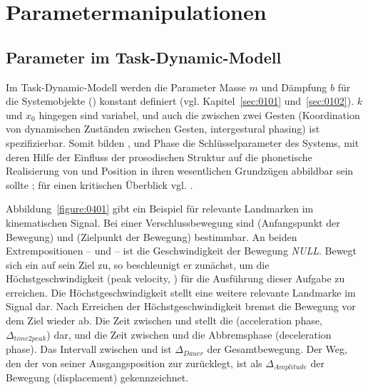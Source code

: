 \chapter{Parametermanipulationen}
\label{chap:04}

\section{Parameter im Task-Dynamic-Modell}
\label{sec:0401}

Im Task-Dynamic-Modell \citep{Browman1986} werden die Parameter Masse $m$ und Dämpfung $b$ für die Systemobjekte () konstant definiert (vgl. Kapitel~\ref{sec:0101} und~\ref{sec:0102}).  $k$ und  ${x}_{0}$ hingegen sind variabel, und auch die  zwischen zwei Gesten (Koordination von dynamischen Zuständen zwischen Gesten, intergestural phasing) ist spezifizierbar. Somit bilden ,  und Phase die Schlüsselparameter des Systems, mit deren Hilfe der Einfluss der prosodischen Struktur auf die phonetische Realisierung von  und Position in ihren wesentlichen Grundzügen abbildbar sein sollte \citep{Kelso1987, Kelso1985, Munhall1985, Beckman1992, Hawkins1992, Harrington1995, Byrd2000a, Cho2002a, Cho2006}; für einen kritischen Überblick vgl. \citet{Fuchs2011}.

Abbildung~\ref{figure:0401} gibt ein Beispiel für relevante Landmarken im kinematischen Signal. Bei einer Verschlussbewegung sind  (Anfangspunkt der Bewegung) und  (Zielpunkt der Bewegung) bestimmbar. An beiden Extrempositionen --  und  -- ist die Geschwindigkeit der Bewegung \emph{NULL}. Bewegt sich ein  auf sein Ziel zu, so beschleunigt er zunächst, um die Höchstgeschwindigkeit (peak velocity, ) für die Ausführung dieser Aufgabe zu erreichen. Die Höchstgeschwindigkeit stellt eine weitere relevante Landmarke im Signal dar. Nach Erreichen der Höchstgeschwindigkeit bremst die Bewegung vor dem Ziel wieder ab. Die Zeit zwischen  und  stellt die  (acceleration phase,  ${\Delta} _{{time}2{peak}}$) dar, und die Zeit zwischen  und  die Abbremsphase (deceleration phase). Das Intervall zwischen  und  ist  ${\Delta} _{{Dauer}}$ der Gesamtbewegung. Der Weg, den der  von seiner Ausgangsposition zur  zurücklegt, ist als  ${\Delta} _{{Amplitude}}$ der Bewegung (displacement) gekennzeichnet. 

